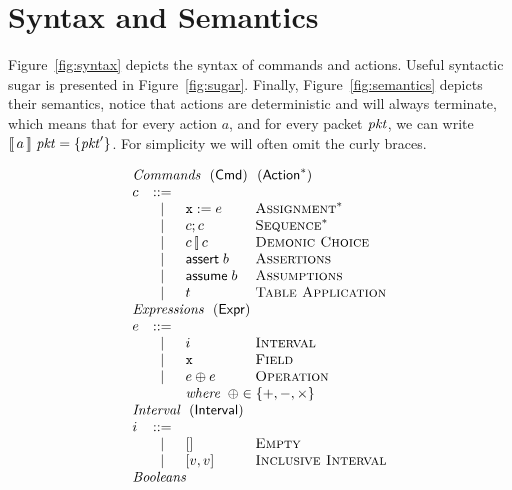 \section{Syntax and Semantics}

Figure~\ref{fig:syntax} depicts the syntax of commands and
actions. Useful syntactic sugar is presented in
Figure~\ref{fig:sugar}. Finally, Figure~\ref{fig:semantics} depicts
their semantics, notice that actions are deterministic and will always
terminate, which means that for every action $a$, and for every packet
$\mathit{pkt}$, we can write $\llbracket\,a\,\rrbracket~\mathit{pkt} = \{\mathit{pkt}'\}$. For simplicity we
will often omit the curly braces.


\begin{figure}[ht]
  \[\begin{array}{l c l l}
      \multicolumn{4}{l}{\textit{Commands}~~(\Cmd)~~(\Action^*)}\\
      c & ::=& \\
        & \mid & \var x := e & \textsc{Assignment}^*\\
        & \mid & c;c & \textsc{Sequence}^* \\
        & \mid & c \angel c & \textsc{Demonic Choice}\\
        & \mid & \assert b & \textsc{Assertions} \\
        & \mid & \assume b & \textsc{Assumptions} \\
        & \mid & t & \textsc{Table Application}\\
      \multicolumn{4}{l}{\textit{Expressions}~~(\Expr)} \\
      e & ::= & \\
        & \mid & i            & \textsc{Interval} \\
        & \mid & \var x       & \textsc{Field} \\
        & \mid & e \oplus e   & \textsc{Operation} \\
        & &  \multicolumn{2}{l}{\textit{where}\;\; \oplus \in \{+,-,\times \}} \\
      \multicolumn{4}{l}{\textit{Interval}~~(\Interval)}\\
      i & ::= & \\
        & \mid & [] & \textsc{Empty} \\
        & \mid & [v, v] & \textsc{Inclusive Interval} \\
      \multicolumn{4}{l}{\textit{Booleans}}\\

\end{array}\]
\end{figure}

